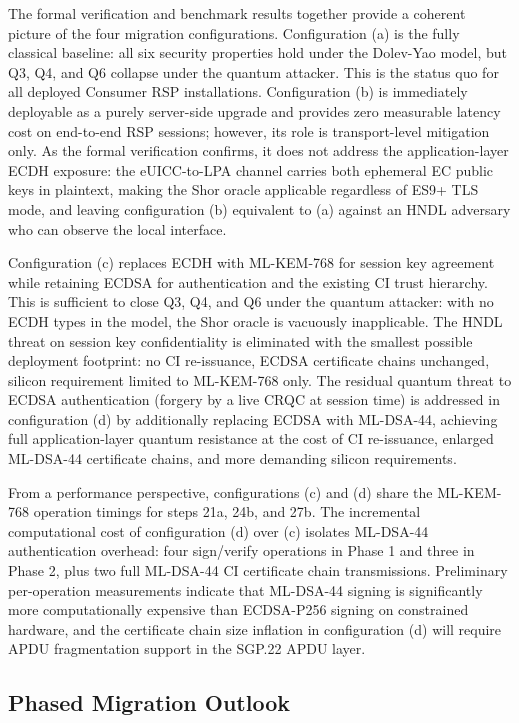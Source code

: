 \documentclass[a4paper,fleqn]{cas-sc}
\begin{document}
The formal verification and benchmark results together provide a coherent
picture of the four migration configurations. Configuration (a) is the
fully classical baseline: all six security properties hold under the
Dolev-Yao model, but Q3, Q4, and Q6 collapse under the quantum attacker.
This is the status quo for all deployed Consumer RSP installations.
Configuration (b) is immediately deployable as a purely server-side
upgrade and provides zero measurable latency cost on end-to-end RSP
sessions; however, its role is transport-level mitigation only. As the
formal verification confirms, it does not address the application-layer
ECDH exposure: the eUICC-to-LPA channel carries both ephemeral EC public
keys in plaintext, making the Shor oracle applicable regardless of ES9+
TLS mode, and leaving configuration (b) equivalent to (a) against an
HNDL adversary who can observe the local interface.

Configuration (c) replaces ECDH with ML-KEM-768 for session key
agreement while retaining ECDSA for authentication and the existing CI
trust hierarchy. This is sufficient to close Q3, Q4, and Q6 under the
quantum attacker: with no ECDH types in the model, the Shor oracle is
vacuously inapplicable. The HNDL threat on session key confidentiality
is eliminated with the smallest possible deployment footprint: no CI
re-issuance, ECDSA certificate chains unchanged, silicon requirement
limited to ML-KEM-768 only. The residual quantum threat to ECDSA
authentication (forgery by a live CRQC at session time) is addressed in
configuration (d) by additionally replacing ECDSA with ML-DSA-44,
achieving full application-layer quantum resistance at the cost of CI
re-issuance, enlarged ML-DSA-44 certificate chains, and more demanding
silicon requirements.

From a performance perspective, configurations (c) and (d) share the
ML-KEM-768 operation timings for steps 21a, 24b, and 27b. The incremental
computational cost of configuration (d) over (c) isolates ML-DSA-44
authentication overhead: four sign/verify operations in Phase 1 and three
in Phase 2, plus two full ML-DSA-44 CI certificate chain transmissions.
Preliminary per-operation measurements indicate that ML-DSA-44 signing is
significantly more computationally expensive than ECDSA-P256 signing on
constrained hardware, and the certificate chain size inflation in
configuration (d) will require APDU fragmentation support in the SGP.22
APDU layer.

\subsection{Phased Migration Outlook}
\label{sec:disc-migration}
\end{document}
